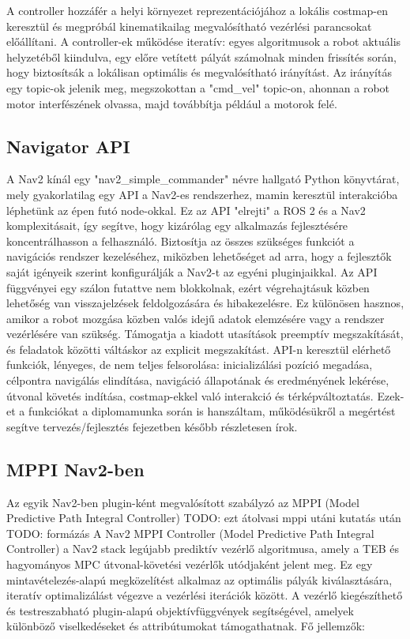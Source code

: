 A controller hozzáfér a helyi környezet reprezentációjához a lokális costmap-en keresztül és megpróbál kinematikailag megvalósítható vezérlési parancsokat előállítani. A controller-ek működése iteratív: egyes algoritmusok a robot aktuális helyzetéből kiindulva, egy előre vetített pályát számolnak minden frissítés során, hogy biztosítsák a lokálisan optimális és megvalósítható irányítást. Az irányítás egy topic-ok jelenik meg, megszokottan a "cmd\_vel" topic-on, ahonnan a robot motor interfészének olvassa, majd továbbítja például a motorok felé. \cite{nav2}

\subsection{Navigator API}
A Nav2 kínál egy "nav2\_simple\_commander" névre hallgató Python könyvtárat, mely gyakorlatilag egy API a Nav2-es rendszerhez, mamin keresztül interakcióba léphetünk az épen futó node-okkal. Ez az API "elrejti" a ROS 2 és a Nav2 komplexitásait, így segítve, hogy kizárólag egy alkalmazás fejlesztésére koncentrálhasson a felhasználó. Biztosítja az összes szükséges funkciót a navigációs rendszer kezeléséhez, miközben lehetőséget ad arra, hogy a fejlesztők saját igényeik szerint konfigurálják a Nav2-t az egyéni pluginjaikkal. Az API függvényei egy szálon futattve nem blokkolnak, ezért végrehajtásuk közben lehetőség van visszajelzések feldolgozására és hibakezelésre. Ez különösen hasznos, amikor a robot mozgása közben valós idejű adatok elemzésére vagy a rendszer vezérlésére van szükség. Támogatja a kiadott utasítások preemptív megszakítását, és feladatok közötti váltáskor az explicit megszakítást. API-n keresztül elérhető funkciók, lényeges, de nem teljes felsorolása: inicializálási pozíció megadása, célpontra navigálás elindítása, navigáció állapotának és eredményének lekérése, útvonal követés indítása, costmap-ekkel való interakció és térképváltoztatás. Ezek-et a funkciókat a diplomamunka során is hanszáltam, működésükről a megértést segítve tervezés/fejlesztés fejezetben később részletesen írok. \cite{nav2}

\subsection{MPPI Nav2-ben}
Az egyik Nav2-ben plugin-ként megvalósított szabályzó az MPPI (Model Predictive Path Integral Controller)
TODO: ezt átolvasi mppi utáni kutatás után
TODO: formázás
A Nav2 MPPI Controller (Model Predictive Path Integral Controller) a Nav2 stack legújabb prediktív vezérlő algoritmusa, amely a TEB és hagyományos MPC útvonal-követési vezérlők utódjaként jelent meg. Ez egy mintavételezés-alapú megközelítést alkalmaz az optimális pályák kiválasztására, iteratív optimalizálást végezve a vezérlési iterációk között. A vezérlő kiegészíthető és testreszabható plugin-alapú objektívfüggvények segítségével, amelyek különböző viselkedéseket és attribútumokat támogathatnak.
Fő jellemzők:

